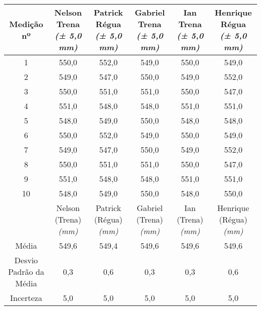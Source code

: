 \documentclass{article}
\begin{document}
\begin{table}[h!]
\centering
\begin{tabular}{c c c c c c }
\toprule
Medição nº & \shortstack{Nelson\\Trena\\\textit{(± 5,0 mm)}} & \shortstack{Patrick\\Régua\\\textit{(± 5,0 mm)}} & \shortstack{Gabriel\\Trena\\\textit{(± 5,0 mm)}} & \shortstack{Ian\\Trena\\\textit{(± 5,0 mm)}} & \shortstack{Henrique\\Régua\\\textit{(± 5,0 mm)}}\\
\midrule
1 & 550,0 & 552,0 & 549,0 & 550,0 & 549,0\\
2 & 549,0 & 547,0 & 550,0 & 549,0 & 552,0\\
3 & 550,0 & 551,0 & 551,0 & 550,0 & 547,0\\
4 & 551,0 & 548,0 & 548,0 & 551,0 & 551,0\\
5 & 548,0 & 549,0 & 550,0 & 548,0 & 548,0\\
6 & 550,0 & 552,0 & 549,0 & 550,0 & 549,0\\
7 & 549,0 & 547,0 & 550,0 & 549,0 & 552,0\\
8 & 550,0 & 551,0 & 551,0 & 550,0 & 547,0\\
9 & 551,0 & 548,0 & 548,0 & 551,0 & 551,0\\
10 & 548,0 & 549,0 & 550,0 & 548,0 & 550,0\\
\midrule
&\shortstack{Nelson\\(Trena)\\\textit{(mm)}} & \shortstack{Patrick\\(Régua)\\\textit{(mm)}} & \shortstack{Gabriel\\(Trena)\\\textit{(mm)}} & \shortstack{Ian\\(Trena)\\\textit{(mm)}} & \shortstack{Henrique\\(Régua)\\\textit{(mm)}}\\
\midrule
Média & 549,6 & 549,4 & 549,6 & 549,6 & 549,6\\[3pt]
\shortstack{Desvio\\Padrão da\\Média} & 0,3 & 0,6 & 0,3 & 0,3 & 0,6\\[3pt]
Incerteza & 5,0 & 5,0 & 5,0 & 5,0 & 5,0\\
\bottomrule
\end{tabular}
\end{table}
\end{document}

